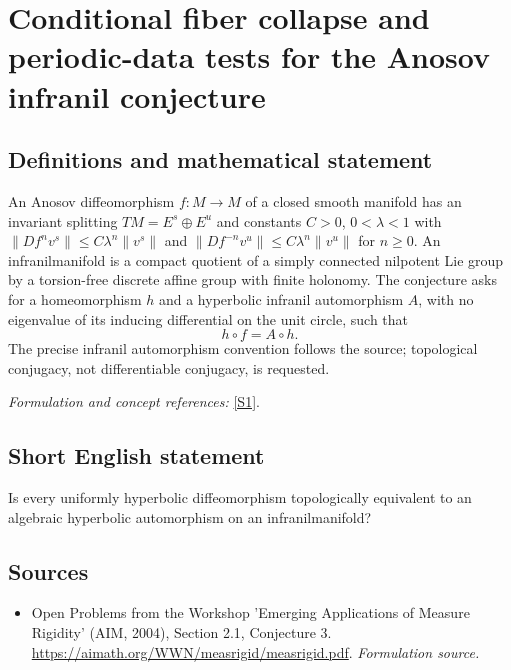 \documentclass[11pt]{article}
\begin{document}
\section*{\texorpdfstring{Conditional fiber collapse and periodic-data tests for the Anosov infranil conjecture}{Conditional fiber collapse and periodic-data tests for the Anosov infranil conjecture}}\label{statement}
\subsection{Definitions and mathematical statement}
An Anosov diffeomorphism $f:M\to M$ of a closed smooth manifold has an invariant splitting $TM=E^s\oplus E^u$ and constants $C>0$, $0<\lambda<1$ with
$\|Df^nv^s\|\le C\lambda^n\|v^s\|$ and
$\|Df^{-n}v^u\|\le C\lambda^n\|v^u\|$ for $n\ge0$.
An infranilmanifold is a compact quotient of a simply connected nilpotent Lie group by a torsion-free discrete affine group with finite holonomy. The conjecture asks for a homeomorphism $h$ and a hyperbolic infranil automorphism $A$, with no eigenvalue of its inducing differential on the unit circle, such that
\[
 h\circ f=A\circ h.
\]
The precise infranil automorphism convention follows the source; topological conjugacy, not differentiable conjugacy, is requested.
\par\smallskip\textit{Formulation and concept references:} \href{https://aimath.org/WWN/measrigid/measrigid.pdf}{[S1]}.

\subsection{Short English statement}
Is every uniformly hyperbolic diffeomorphism topologically equivalent to an algebraic hyperbolic automorphism on an infranilmanifold?
\subsection{Sources}
\begin{itemize}
\item[S1]Open Problems from the Workshop 'Emerging Applications of Measure Rigidity' (AIM, 2004), Section 2.1, Conjecture 3.
\url{https://aimath.org/WWN/measrigid/measrigid.pdf}.
\textit{Formulation source.}
\end{itemize}
\end{document}
